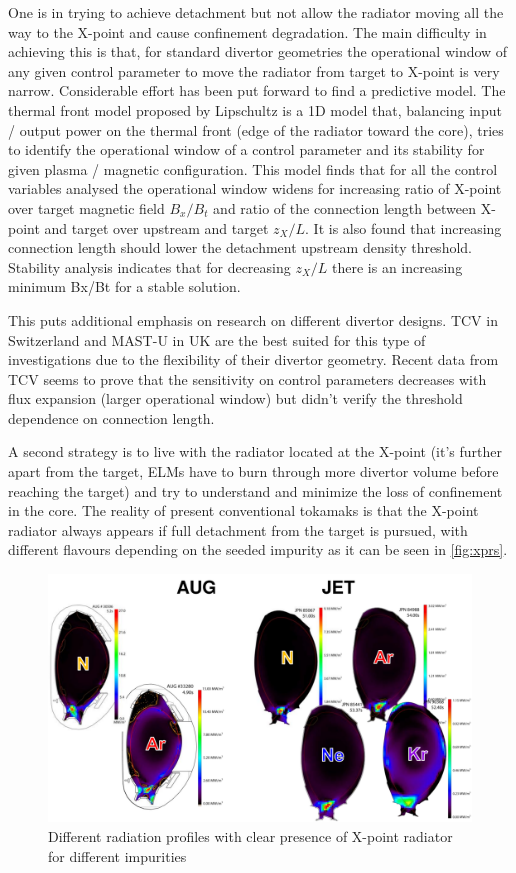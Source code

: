 One is in trying to achieve detachment but not allow the radiator moving all the way to the X-point and cause confinement degradation. The main difficulty in achieving this is that, for standard divertor geometries the operational window of any given control parameter to move the radiator from target to X-point is very narrow. Considerable effort has been put forward to find a predictive model. The thermal front model proposed by Lipschultz \cite{Lipschultz2016} is a 1D model that, balancing input / output power on the thermal front (edge of the radiator toward the core), tries to identify the operational window of a control parameter and its stability for given plasma / magnetic configuration. This model finds that for all the control variables analysed the operational window widens for increasing ratio of X-point over target magnetic field $B_x/B_t$ and ratio of the connection length between X-point and target over upstream and target $z_X/L$. It is also found that increasing connection length should lower the detachment upstream density threshold. Stability analysis indicates that for decreasing $z_X/L$ there is an increasing minimum Bx/Bt for a stable solution.\cite{Lipschultz2016}

This puts additional emphasis on research on different divertor designs. TCV in Switzerland and MAST-U in UK are the best suited for this type of investigations due to the flexibility of their divertor geometry. Recent data from TCV seems to prove that the sensitivity on control parameters decreases with flux expansion (larger operational window) but didn’t verify the threshold dependence on connection length. \cite{Theiler2017}

A second strategy is to live with the radiator located at the X-point (it’s further apart from the target, ELMs have to burn through more divertor volume before reaching the target) and try to understand and minimize the loss of confinement in the core. The reality of present conventional tokamaks is that the X-point radiator always appears if full detachment from the target is pursued, with different flavours depending on the seeded impurity as it can be seen in \autoref{fig:xprs}.

\begin{figure}
	\centering
	\includegraphics[width=\linewidth]{Chapters/chapter1/figs/xprs.png}
	\caption{Different radiation profiles with clear presence of X-point radiator for different impurities
	\cite{Wiesen2017}}
	\label{fig:xprs}
\end{figure}


